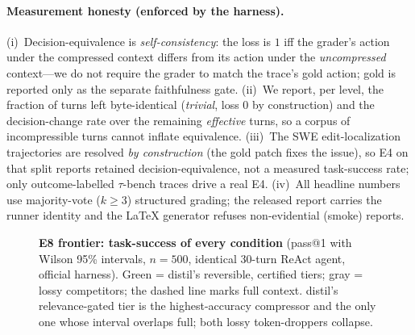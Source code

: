 \documentclass{article}
\begin{document}
\paragraph{Measurement honesty (enforced by the harness).} (i)~Decision-equivalence
is \emph{self-consistency}: the loss is $1$ iff the grader's action under the
compressed context differs from its action under the \emph{uncompressed} context---we
do not require the grader to match the trace's gold action; gold is reported only as
the separate faithfulness gate. (ii)~We report, per level, the fraction of turns left
byte-identical (\emph{trivial}, loss $0$ by construction) and the decision-change rate
over the remaining \emph{effective} turns, so a corpus of incompressible turns cannot
inflate equivalence. (iii)~The SWE edit-localization trajectories are resolved
\emph{by construction} (the gold patch fixes the issue), so E4 on that split reports
retained decision-equivalence, not a measured task-success rate; only
outcome-labelled $\tau$-bench traces drive a real E4. (iv)~All headline
numbers use majority-vote ($k{\ge}3$) structured grading; the released report carries
the runner identity and the LaTeX generator refuses non-evidential (smoke) reports.



\begin{figure}[t]
\centering
{}
\caption{\textbf{E8 frontier: task-success of every condition} (pass@1 with Wilson 95\%
intervals, $n{=}500$, identical 30-turn ReAct agent, official harness). \textcolor{distilgreen}{Green}
= distil's reversible, certified tiers; \textcolor{distilgray}{gray} = lossy competitors; the
dashed line marks full context. distil's relevance-gated tier is the highest-accuracy
compressor and the only one whose interval overlaps full; both lossy token-droppers collapse.}
\label{fig:e8frontier}
\end{figure}
\end{document}
